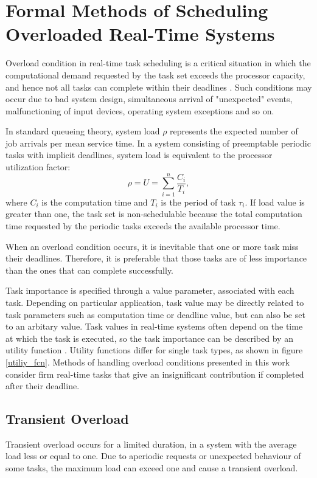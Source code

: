 \chapter{Formal Methods of Scheduling Overloaded Real-Time Systems}
Overload condition in real-time task scheduling is a critical situation in which the computational demand requested by the task set exceeds the processor capacity, and hence not all tasks can complete within their deadlines 
\cite{lee2007handbook}.
Such conditions may occur due to bad system design, simultaneous arrival of "unexpected" events, malfunctioning of input devices, operating system exceptions and so on.

In standard queueing theory, system load $\rho$ represents the expected number of job arrivals per mean service time. 
In a system consisting of preemptable periodic tasks with implicit deadlines, system load is equivalent to the processor utilization factor:
\begin{equation*}
\rho = U = \sum_{i=1}^{n}\frac{C_i}{T_i},
\end{equation*}
where $C_i$ is the computation time and $T_i$ is the period of task $\tau_i$.
If load value is greater than one, the task set is non-schedulable because the total computation time requested by the periodic tasks exceeds the available processor time.

When an overload condition occurs, it is inevitable that one or more task miss their deadlines. 
Therefore, it is preferable that those tasks are of less importance than the ones that can complete successfully. 

Task importance is specified through a value parameter, associated with each task.
Depending on particular application, task value may be directly related to task parameters such as computation time or deadline value, but can also be set to an arbitary value.
Task values in real-time systems often depend on the time at which the task is executed, so the task importance can be described by an utility function 
\cite{buttazzo2011hard}.
Utility functions differ for single task types, as shown in figure \ref{utiliy_fcn}.
Methods of handling overload conditions presented in this work consider firm real-time tasks that give an insignificant contribution if completed after their deadline.

\section{Transient Overload}
Transient overload occurs for a limited duration, in a system with the average load less or equal to one.
Due to aperiodic requests or unexpected behaviour of some tasks, the maximum load can exceed one and cause a transient overload.

